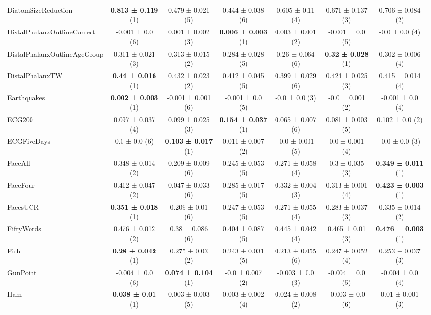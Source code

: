 \begin{table}[ht]
\begin{adjustbox}{width=\textwidth}
\begin{tabular}{lcccccc}
    DiatomSizeReduction & \textbf{0.813 ± 0.119} (1) & 0.479 ± 0.021 (5) & 0.444 ± 0.038 (6) & 0.605 ± 0.11 (4) & 0.671 ± 0.137 (3) & 0.706 ± 0.084 (2) \\
    DistalPhalanxOutlineCorrect & -0.001 ± 0.0 (6) & 0.001 ± 0.002 (3) & \textbf{0.006 ± 0.003} (1) & 0.003 ± 0.001 (2) & -0.001 ± 0.0 (5) & -0.0 ± 0.0 (4) \\
    DistalPhalanxOutlineAgeGroup & 0.311 ± 0.021 (3) & 0.313 ± 0.015 (2) & 0.284 ± 0.028 (5) & 0.26 ± 0.064 (6) & \textbf{0.32 ± 0.028} (1) & 0.302 ± 0.006 (4) \\
    DistalPhalanxTW & \textbf{0.44 ± 0.016} (1) & 0.432 ± 0.023 (2) & 0.412 ± 0.045 (5) & 0.399 ± 0.029 (6) & 0.424 ± 0.025 (3) & 0.415 ± 0.014 (4) \\
    Earthquakes & \textbf{0.002 ± 0.003} (1) & -0.001 ± 0.001 (6) & -0.001 ± 0.0 (5) & -0.0 ± 0.0 (3) & -0.0 ± 0.001 (2) & -0.001 ± 0.0 (4) \\
    ECG200 & 0.097 ± 0.037 (4) & 0.099 ± 0.025 (3) & \textbf{0.154 ± 0.037} (1) & 0.065 ± 0.007 (6) & 0.081 ± 0.003 (5) & 0.102 ± 0.0 (2) \\
    ECGFiveDays & 0.0 ± 0.0 (6) & \textbf{0.103 ± 0.017} (1) & 0.011 ± 0.007 (2) & -0.0 ± 0.001 (5) & 0.0 ± 0.001 (4) & -0.0 ± 0.0 (3) \\
    FaceAll & 0.348 ± 0.014 (2) & 0.209 ± 0.009 (6) & 0.245 ± 0.053 (5) & 0.271 ± 0.058 (4) & 0.3 ± 0.035 (3) & \textbf{0.349 ± 0.011} (1) \\
    FaceFour & 0.412 ± 0.047 (2) & 0.047 ± 0.033 (6) & 0.285 ± 0.017 (5) & 0.332 ± 0.004 (3) & 0.313 ± 0.001 (4) & \textbf{0.423 ± 0.003} (1) \\
    FacesUCR & \textbf{0.351 ± 0.018} (1) & 0.209 ± 0.01 (6) & 0.247 ± 0.053 (5) & 0.271 ± 0.055 (4) & 0.283 ± 0.037 (3) & 0.335 ± 0.014 (2) \\
    FiftyWords & 0.476 ± 0.012 (2) & 0.38 ± 0.086 (6) & 0.404 ± 0.087 (5) & 0.445 ± 0.042 (4) & 0.465 ± 0.01 (3) & \textbf{0.476 ± 0.003} (1) \\
    Fish & \textbf{0.28 ± 0.042} (1) & 0.275 ± 0.03 (2) & 0.243 ± 0.031 (5) & 0.213 ± 0.055 (6) & 0.247 ± 0.052 (4) & 0.253 ± 0.037 (3) \\
    GunPoint & -0.004 ± 0.0 (6) & \textbf{0.074 ± 0.104} (1) & -0.0 ± 0.007 (2) & -0.003 ± 0.0 (3) & -0.004 ± 0.0 (5) & -0.004 ± 0.0 (4) \\
    Ham & \textbf{0.038 ± 0.01} (1) & 0.003 ± 0.003 (5) & 0.003 ± 0.002 (4) & 0.024 ± 0.008 (2) & -0.003 ± 0.0 (6) & 0.01 ± 0.001 (3) \\

\end{tabular}
\end{adjustbox}
\end{table}

